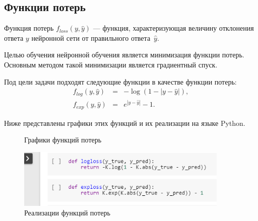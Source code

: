 \subsection{Функции потерь}\label{subsec:losses}

\begin{definition}
  Функция потерь $f_{loss}(y, \hat{y})$ --- функция, характеризующая величину отклонения ответа $y$ нейронной сети от правильного ответа~$\hat{y}$.
\end{definition}

Целью обучения нейронной обучения является минимизация функции потерь. Основным методом такой минимизации является градиентный спуск\cite[с.\,151]{bib:neural_networks2}.

Под цели задачи подходят следующие функции в качестве функции потерь:
\begin{eqnarray}
  \nonumber f_{log}(y, \hat{y}) &=& -\log(1 - |y-\hat{y}|), \\
  \nonumber f_{exp}(y, \hat{y}) &=& e^{|y-\hat{y}|} - 1.
\end{eqnarray}

Ниже представлены графики этих функций и их реализации\cite[раздел backend]{bib:keras} на языке Python.
\begin{figure}[h]
\caption{Графики функций потерь}\label{fig:custom_losses}
\end{figure}

\begin{figure}[h]
    \centering
    \includegraphics[width=0.9\textwidth]{losses_python.png}
    \caption{Реализации функций потерь}\label{fig:custom_losses}
    \label{fig:losses_python}
\end{figure}

%
